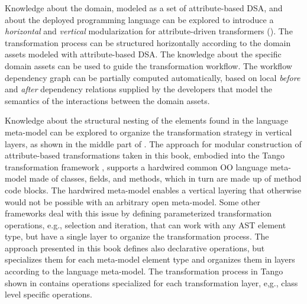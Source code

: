 Knowledge about the domain, modeled as a set of attribute-based DSA, and about the deployed programming language can be explored to introduce a \textit{horizontal} and \textit{vertical} modularization for attribute-driven transformers (). The transformation process can be structured horizontally according to the domain assets modeled with attribute-based DSA. The knowledge about the specific domain assets can be used to guide the transformation workflow. The workflow dependency graph can be partially computed automatically, based on local \textit{before} and \textit{after} dependency relations supplied by the developers that model the semantics of the interactions between the domain assets.

Knowledge about the structural nesting of the elements found in the language meta-model can be explored to organize the transformation strategy in vertical layers, as shown in the middle part of . The approach for modular construction of attribute-based transformations taken in this book, embodied into the Tango transformation framework , supports a hardwired common OO language meta-model made of classes, fields, and methods, which in turn are made up of method code blocks. The hardwired meta-model enables a vertical layering that otherwise would not be possible with an arbitrary open meta-model. Some other frameworks \cite{stratego.01,www.aspectjt} deal with this issue by defining parameterized transformation operations, e.g., selection and iteration, that can work with any AST element type, but have a single layer to organize the transformation process. The approach presented in this book defines also declarative operations, but specializes them for each meta-model element type and organizes them in layers according to the language meta-model. The transformation process in Tango shown in  contains operations specialized for each transformation layer, e,g., class level specific operations. %



